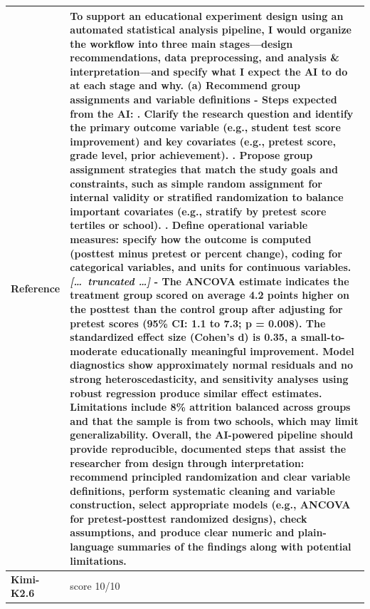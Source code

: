 \begin{longtable}{@{}l p{12.5cm}@{}}
  \textbf{Reference} & To support an educational experiment design using an automated statistical analysis pipeline, I would organize the workflow into three main stages---design recommendations, data preprocessing, and analysis \& interpretation---and specify what I expect the AI to do at each stage and why. \newline (a) Recommend group assignments and variable definitions \newline - Steps expected from the AI: \newline 1. Clarify the research question and identify the primary outcome variable (e.g., student test score improvement) and key covariates (e.g., pretest score, grade level, prior achievement). \newline 2. Propose group assignment strategies that match the study goals and constraints, such as simple random assignment for internal validity or stratified randomization to balance important covariates (e.g., stratify by pretest score tertiles or school). \newline 3. Define operational variable measures: specify how the outcome is computed (posttest minus pretest or percent change), coding for categorical variables, and units for continuous variables. \newline \textit{[\ldots\ truncated \ldots]} \newline - The ANCOVA estimate indicates the treatment group scored on average 4.2 points higher on the posttest than the control group after adjusting for pretest scores (95\% CI: 1.1 to 7.3; p = 0.008). The standardized effect size (Cohen's d) is 0.35, a small-to-moderate educationally meaningful improvement. Model diagnostics show approximately normal residuals and no strong heteroscedasticity, and sensitivity analyses using robust regression produce similar effect estimates. Limitations include 8\% attrition balanced across groups and that the sample is from two schools, which may limit generalizability. \newline Overall, the AI-powered pipeline should provide reproducible, documented steps that assist the researcher from design through interpretation: recommend principled randomization and clear variable definitions, perform systematic cleaning and variable construction, select appropriate models (e.g., ANCOVA for pretest-posttest randomized designs), check assumptions, and produce clear numeric and plain-language summaries of the findings along with potential limitations. \\
  \midrule
  \textbf{Kimi-K2.6} & score 10/10 \\

\end{longtable}
